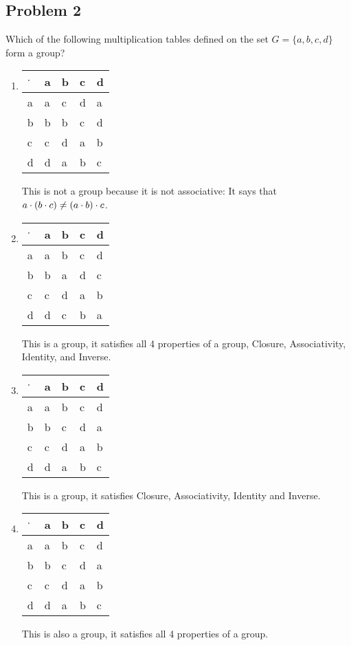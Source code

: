 \documentclass[12pt]{article}
\begin{document}
\subsection{Problem 2}
Which of the following multiplication tables defined on the set $G=\{a,b,c,d\}$ form a group?
\begin{enumerate}[label=(\alph*)]
    \item
    \begin{table}[h]
\begin{tabular}{l|llll}
$\cdot$ & a & b & c & d \\ \hline
a                    & a & c & d & a \\
b                    & b & b & c & d \\
c                    & c & d & a & b \\
d                    & d & a & b & c
\end{tabular}
\end{table}
This is not a group because it is not associative: It says that $a\cdot(b\cdot c)\centernot=(a\cdot b)\cdot c$.
    \item 
    \begin{table}[h]
\begin{tabular}{l|llll}
$\cdot$ & a & b & c & d \\ \hline
a                    & a & b & c & d \\
b                    & b & a & d & c \\
c                    & c & d & a & b \\
d                    & d & c & b & a
\end{tabular}
\end{table}
This is a group, it satisfies all 4 properties of a group, Closure, Associativity, Identity, and Inverse.
\newpage
\item
\begin{table}[h]
\begin{tabular}{l|llll}
$\cdot$ & a & b & c & d \\ \hline
a                    & a & b & c & d \\
b                    & b & c & d & a \\
c                    & c & d & a & b \\
d                    & d & a & b & c
\end{tabular}
\end{table}
This is a group, it satisfies Closure, Associativity, Identity and Inverse.
\item
\begin{table}[h]
\begin{tabular}{l|llll}
$\cdot$ & a & b & c & d \\ \hline
a                    & a & b & c & d \\
b                    & b & c & d & a \\
c                    & c & d & a & b \\
d                    & d & a & b & c
\end{tabular}
\end{table}
This is also a group, it satisfies all 4 properties of a group.
\end{enumerate}
\end{document}
